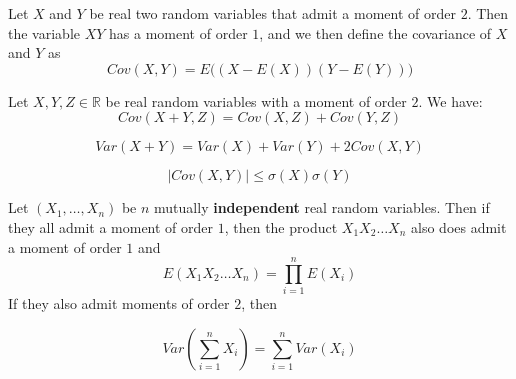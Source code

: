 \documentclass[
10pt, %
a4paper, %
oneside, %
headinclude,footinclude, %
BCOR5mm, %
]{scrartcl}
\begin{document}
\begin{proposition}
    Let $X$ and $Y$ be real two random variables that admit a moment of order $2$. Then the variable $XY$ has a moment of order $1$, and we then define the covariance of $X$ and $Y$ as
    \begin{equation*}
	Cov(X,Y) = E\big( (X-E(X))(Y-E(Y))\big)
    \end{equation*}
\end{proposition}
    

\begin{lemma}
    Let $X, Y, Z\in \mathbb{R} $ be real random variables with a moment of order $2$. We have:
\begin{equation*}
    Cov(X+Y, Z) = Cov(X,Z)+Cov(Y,Z)
\end{equation*}

\begin{equation*}
    Var(X+Y) = Var(X)+Var(Y)+2Cov(X,Y)
\end{equation*}

\begin{equation*}
    |Cov(X,Y)|\leq \sigma(X)\sigma(Y)
\end{equation*}
\end{lemma}

\begin{proposition}
    Let $(X_1, \dots, X_n)$ be $n$ mutually \textbf{{independent}}  real random variables. Then if they all admit a moment of order $1$, then the product $X_1X_2\dots X_n$ also does admit a moment of order $1$ and 
    \begin{equation}
	E(X_1X_2\dots X_n) = \prod^{n}_{i=1} E(X_i)
    \end{equation}
    If they also admit moments of order $2$, then
    
    \begin{equation}
	Var( \sum^{n}_{i=1} X_i ) = \sum^{n}_{i=1} Var(X_i)
    \end{equation}
\end{proposition}
\end{document}

